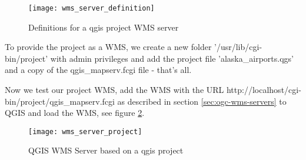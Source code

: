 \begin{figure}[ht]
\centering
\texttt{[image: wms\_server\_definition]}
\caption{Definitions for a qgis project WMS server \nixcaption}
\label{fig:wmsdefinition}
\end{figure}

To provide the project as a WMS, we create a new folder '/usr/lib/cgi-bin/project' 
with admin privileges and add the project file 'alaska\_airports.qgs' and a copy 
of the qgis\_mapserv.fcgi file - that's all.

Now we test our project WMS, add the WMS with the URL 
http://localhost/cgi-bin/project/qgis\_mapserv.fcgi as described in section 
\ref{sec:ogc-wms-servers} to QGIS and load the WMS, see figure 
\ref{fig:wmsproject}.

\begin{figure}[ht]
\centering
\texttt{[image: wms\_server\_project]}
\caption{QGIS WMS Server based on a qgis project \nixcaption}
\label{fig:wmsproject}
\end{figure}

\FloatBarrier
